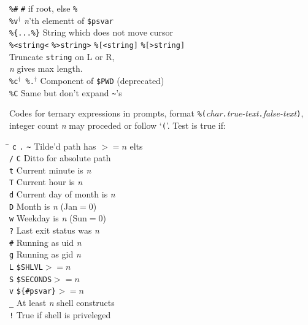 \documentclass{article}
\newcommand\I[1]{\textsl{#1}}
\newcommand\T[1]{\texttt{#1}}
\newcommand\D{$^\dag$}
\begin{document}
\begin{multicols}{3}
\begin{tabbing}
\verb!%#!          \> \verb!#! if root, else \verb!%! \\
\verb!%v!\D        \> \I{n}'th elementt of \verb!$psvar! \\
\verb!%{...%}!     \> String which does not move cursor \\
\verb!%<string<! \verb!%>string>! \verb!%[<string]! \verb!%[>string]! \\
                   \> Truncate \T{string} on L or R, \\
                   \> \I{n} gives max length. \\
\verb!%c!\D\ \verb!%.!\D 
                   \> Component of \verb!$PWD! (deprecated) \\
\verb!%C!          \> Same but don't expand \verb!~!'s \\
\end{tabbing}

Codes for ternary expressions in prompts, format
\verb!%(!\I{char}\verb!.!\I{true-text}\verb!.!\I{false-text}\verb!)!,
integer count \I{n} may proceded or follow `\verb!(!'. Test is true if:
\begin{tabbing}
\hskip 40pt \= \kill
\T{c} \verb!.! \verb!~! \> Tilde'd path has $>=n$ elts \\
\verb!/! \T{C}     \> Ditto for absolute path \\
\T{t}              \> Current minute is \I{n} \\
\T{T}              \> Current hour is \I{n} \\
\T{d}              \> Current day of month is \I{n} \\
\T{D}              \> Month is \I{n} (Jan${}=0$) \\
\T{w}              \> Weekday is \I{n} (Sun${}=0$) \\
\verb!?!           \> Last exit status was \I{n} \\
\verb!#!           \> Running as uid \I{n} \\
\T{g}              \> Running as gid \I{n} \\
\T{L}              \> \verb!$SHLVL!${}>=n$ \\
\T{S}              \> \verb!$SECONDS!${}>=n$ \\
\T{v}              \> \verb!${#psvar}!${}>=n$ \\
\verb!_!           \> At least \I{n} shell constructs \\
\verb.!.           \> True if shell is priveleged \\
\end{tabbing}


\end{multicols}
\end{document}
